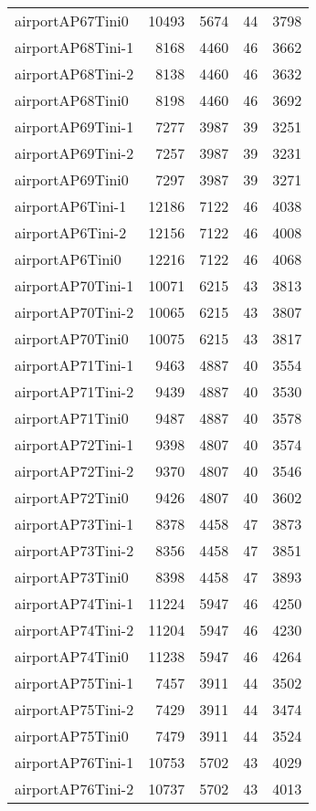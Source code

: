 \begin{longtable}{lrrrr}
airportAP67Tini0 & 10493 & 5674 & 44 & 3798 \\
airportAP68Tini-1 & 8168 & 4460 & 46 & 3662 \\
airportAP68Tini-2 & 8138 & 4460 & 46 & 3632 \\
airportAP68Tini0 & 8198 & 4460 & 46 & 3692 \\
airportAP69Tini-1 & 7277 & 3987 & 39 & 3251 \\
airportAP69Tini-2 & 7257 & 3987 & 39 & 3231 \\
airportAP69Tini0 & 7297 & 3987 & 39 & 3271 \\
airportAP6Tini-1 & 12186 & 7122 & 46 & 4038 \\
airportAP6Tini-2 & 12156 & 7122 & 46 & 4008 \\
airportAP6Tini0 & 12216 & 7122 & 46 & 4068 \\
airportAP70Tini-1 & 10071 & 6215 & 43 & 3813 \\
airportAP70Tini-2 & 10065 & 6215 & 43 & 3807 \\
airportAP70Tini0 & 10075 & 6215 & 43 & 3817 \\
airportAP71Tini-1 & 9463 & 4887 & 40 & 3554 \\
airportAP71Tini-2 & 9439 & 4887 & 40 & 3530 \\
airportAP71Tini0 & 9487 & 4887 & 40 & 3578 \\
airportAP72Tini-1 & 9398 & 4807 & 40 & 3574 \\
airportAP72Tini-2 & 9370 & 4807 & 40 & 3546 \\
airportAP72Tini0 & 9426 & 4807 & 40 & 3602 \\
airportAP73Tini-1 & 8378 & 4458 & 47 & 3873 \\
airportAP73Tini-2 & 8356 & 4458 & 47 & 3851 \\
airportAP73Tini0 & 8398 & 4458 & 47 & 3893 \\
airportAP74Tini-1 & 11224 & 5947 & 46 & 4250 \\
airportAP74Tini-2 & 11204 & 5947 & 46 & 4230 \\
airportAP74Tini0 & 11238 & 5947 & 46 & 4264 \\
airportAP75Tini-1 & 7457 & 3911 & 44 & 3502 \\
airportAP75Tini-2 & 7429 & 3911 & 44 & 3474 \\
airportAP75Tini0 & 7479 & 3911 & 44 & 3524 \\
airportAP76Tini-1 & 10753 & 5702 & 43 & 4029 \\
airportAP76Tini-2 & 10737 & 5702 & 43 & 4013 \\

\end{longtable}
